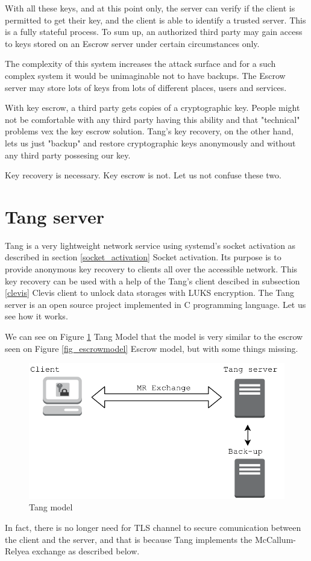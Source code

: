 With all these keys, and at this point only, the server can verify if the client is permitted to get their key, and the client is able to identify a trusted server.
This is a fully stateful process.
To sum up, an authorized third party may gain access to keys stored on an Escrow server under certain circumstances only.

The complexity of this system increases the attack surface and for a such complex system it would be unimaginable not to have backups.
The Escrow server may store lots of keys from lots of different places, users and services.

With key escrow, a third party gets copies of a cryptographic key.
People might not be comfortable with any third party having this ability and that "technical" problems vex the key escrow solution.
Tang's key recovery, on the other hand, lets us just "backup" and restore cryptographic keys anonymously and without any third party possesing our key.

Key recovery is necessary.
Key escrow is not.
Let us not confuse these two.



\section{Tang server}\label{tang}

Tang is a very lightweight network service using systemd's socket activation as described in section \ref{socket_activation} Socket activation.
Its purpose is to provide anonymous key recovery to clients all over the accessible network.
This key recovery can be used with a help of the Tang's client descibed in subsection \ref{clevis} Clevis client to unlock data storages with LUKS encryption.
The Tang server is an open source project implemented in C programming language.
Let us see how it works.

We can see on Figure \ref{fig_tangmodel} Tang Model that the model is very similar to the escrow seen on Figure \ref{fig_escrowmodel} Escrow model, but with some things missing.
\begin{figure}[h]
    \centering
    \includegraphics[scale=0.7]{figures/TangModel.pdf}
    \caption{Tang model}
    \label{fig_tangmodel}
\end{figure}
In fact, there is no longer need for TLS channel to secure comunication between the client and the server,
 and that is because Tang implements the McCallum-Relyea exchange as described below.

